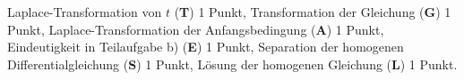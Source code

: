 \begin{bewertung}
Laplace-Transformation von $t$ ({\bf T}) 1 Punkt,
Transformation der Gleichung ({\bf G}) 1 Punkt,
Laplace-Transformation der Anfangsbedingung ({\bf A}) 1 Punkt,
Eindeutigkeit in Teilaufgabe b) ({\bf E}) 1 Punkt,
Separation der homogenen Differentialgleichung ({\bf S}) 1 Punkt,
Lösung der homogenen Gleichung ({\bf L}) 1 Punkt.
\end{bewertung}
